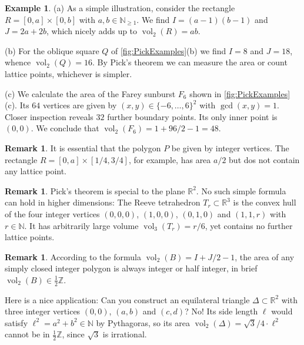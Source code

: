 \documentclass[a4paper]{amsart}
\numberwithin{equation}{section}
\theoremstyle{plain}
\theoremstyle{definition}
\newtheorem{remark}[theorem]{Remark}
\newtheorem{example}[theorem]{Example}
\newcommand{\N}{\mathbb{N}}
\newcommand{\Z}{\mathbb{Z}}
\newcommand{\R}{\mathbb{R}}
\DeclareMathOperator{\vol}{vol}
\begin{document}
\begin{example}
  (a) As a simple illustration, consider %
  the rectangle $R = [0,a] \times [0,b]$ with $a,b \in \N_{\ge1}$.
  We find $I = (a-1) (b-1)$ and $J = 2 a + 2 b$,
  which nicely adds up to $\vol_2(R) = a b$.

  (b) For the oblique square $Q$ of \autoref{fig:PickExamples}(b) 
  we find $I = 8$ and $J = 18$, whence $\vol_2(Q) = 16$.
  By Pick's theorem we can measure the area
  or count lattice points, whichever is simpler.
  
  (c) We calculate the area of the Farey sunburst $F_6$ shown in \autoref{fig:PickExamples}(c).
  Its $64$ vertices are given by $(x,y) \in \{-6,\dots,6\}^2$ with $\gcd(x,y) = 1$.
  Closer inspection reveals $32$ further boundary points. Its only inner point is $(0,0)$.
  We conclude that $\vol_2(F_6) = 1 + 96/2 - 1 = 48$.
\end{example}


\begin{remark}
  It is essential that the polygon $P$ be given by integer vertices.
  The rectangle $R = [0,a] \times [1/4,3/4]$, for example,
  has area $a/2$ but dos not contain any lattice point.
\end{remark}

\begin{remark}
  Pick's theorem is special to the plane $\R^2$.
  No such simple formula can hold in higher dimensions:
  The Reeve tetrahedron $T_r \subset \R^3$ is the convex
  hull of the four integer vertices $(0,0,0)$, $(1,0,0)$, $(0,1,0)$
  and $(1,1,r)$ with $r \in \N$.
  It has arbitrarily large volume $\vol_3(T_r) = r/6$,
  yet contains no further lattice points.
\end{remark}

\begin{remark}
  According to the formula $\vol_2(B) = I + J/2 - 1$,
  the area of any simply closed integer polygon
  is always integer or half integer,
  in brief $\vol_2(B) \in \frac{1}{2} \Z$.

  Here is a nice application: %
  Can you construct an equilateral triangle $\Delta \subset \R^2$
  with three integer vertices $(0,0)$, $(a,b)$ and $(c,d)$?
  No!  Its side length $\ell$ would satisfy $\ell^2 = a^2 + b^2 \in \N$ by Pythagoras,
  so its area $\vol_2(\Delta) = \sqrt{3}/4 \cdot \ell^2$
  cannot be in $\frac{1}{2} \Z$, since $\sqrt{3}$ is irrational.
\end{remark}
\end{document}
